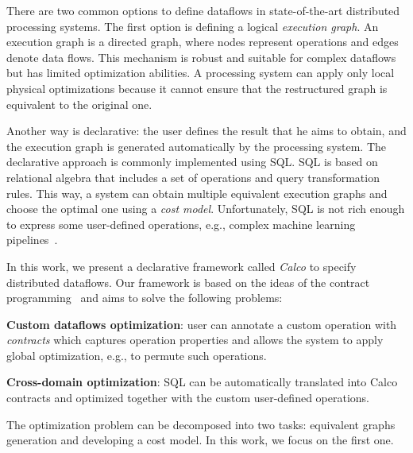 There are two common options to define dataflows in state-of-the-art distributed processing systems.
The first option is defining a logical {\em execution graph}.
An execution graph is a directed graph, where nodes represent operations and edges denote data flows.
This mechanism is robust and suitable for complex dataflows but has limited optimization abilities.
A processing system can apply only local physical optimizations because it cannot ensure that the restructured graph is equivalent to the original one.

Another way is declarative: the user defines the result that he aims to obtain, and the execution graph is generated automatically by the processing system.
The declarative approach is commonly implemented using SQL.
SQL is based on relational algebra that includes a set of operations and query transformation rules.
This way, a system can obtain multiple equivalent execution graphs and choose the optimal one using a {\em cost model}.
Unfortunately, SQL is not rich enough to express some user-defined operations, e.g., complex machine learning pipelines~\cite{schule2019mlearn}.

In this work, we present a declarative framework called {\em Calco} to specify distributed dataflows.
Our framework is based on the ideas of the contract programming~\cite{meyer2002design} and aims to solve the following problems:

{\bf Custom dataflows optimization}: user can annotate a custom operation with {\em contracts} which captures operation properties and allows the system to apply global optimization, e.g., to permute such operations.

{\bf Cross-domain optimization}: SQL can be automatically translated into Calco contracts and optimized together with the custom user-defined operations.

The optimization problem can be decomposed into two tasks: equivalent graphs generation and developing a cost model.
In this work, we focus on the first one.
